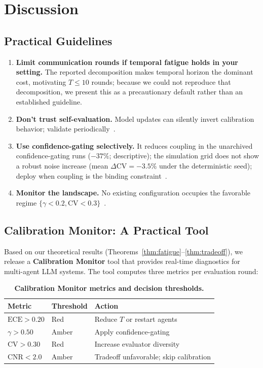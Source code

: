 \documentclass[11pt]{article}
\newcommand{\CV}{\ensuremath{\mathrm{CV}}}
\newcommand{\ECE}{\ensuremath{\mathrm{ECE}}}
\theoremstyle{definition}
\theoremstyle{remark}
\begin{document}
\section{Discussion}

\subsection{Practical Guidelines}

\begin{enumerate}[leftmargin=*,nosep]
    \item \textbf{Limit communication rounds if temporal fatigue holds in your setting.} The reported decomposition makes temporal horizon the dominant cost, motivating $T \leq 10$ rounds; because we could not reproduce that decomposition, we present this as a precautionary default rather than an established guideline.
    \item \textbf{Don't trust self-evaluation.} Model updates can silently invert calibration behavior; validate periodically~\citep{zhou2024incontext}.
    \item \textbf{Use confidence-gating selectively.} It reduces coupling in the unarchived confidence-gating runs ($-37\%$; descriptive); the simulation grid does not show a robust noise increase (mean $\Delta\CV = -3.5\%$ under the deterministic seed); deploy when coupling is the binding constraint~\citep{chen2025unicr}.
    \item \textbf{Monitor the landscape.} No existing configuration occupies the favorable regime $\{\gamma < 0.2, \CV < 0.3\}$~\citep{caleffects2026}.
\end{enumerate}

\subsection{Calibration Monitor: A Practical Tool}\label{sec:monitor}

Based on our theoretical results (Theorems~\ref{thm:fatigue}--\ref{thm:tradeoff}), we release a \textbf{Calibration Monitor} tool that provides real-time diagnostics for multi-agent LLM systems. The tool computes three metrics per evaluation round:

\begin{table}[H]
\centering
\caption{\textbf{Calibration Monitor metrics and decision thresholds.}}
\label{tab:monitor}
\begin{tabular}{@{}lll@{}}
\toprule
Metric & Threshold & Action \\
\midrule
$\ECE > 0.20$ & Red & Reduce $T$ or restart agents \\
$\gamma > 0.50$ & Amber & Apply confidence-gating \\
$\CV > 0.30$ & Red & Increase evaluator diversity \\
$\text{CNR} < 2.0$ & Amber & Tradeoff unfavorable; skip calibration \\
\bottomrule
\end{tabular}
\end{table}
\end{document}

